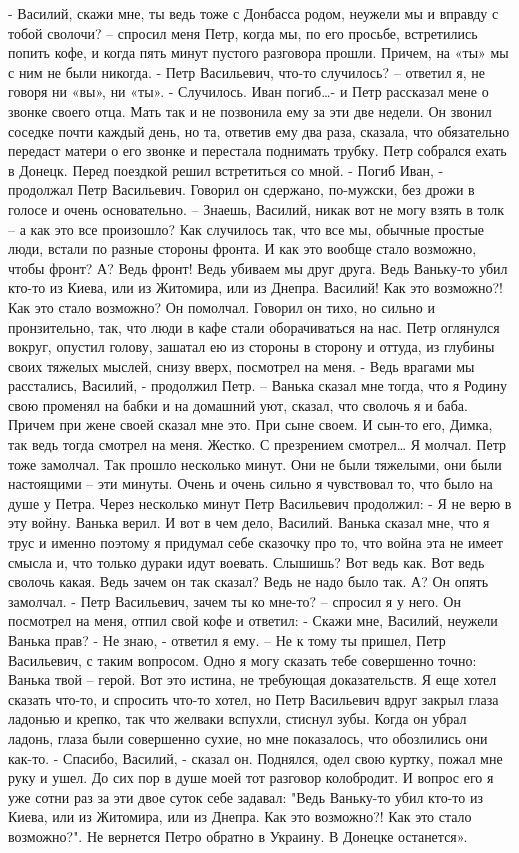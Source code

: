 - Василий, скажи мне, ты ведь тоже с Донбасса родом, неужели мы и вправду с тобой сволочи? – спросил меня Петр, когда мы, по его просьбе, встретились попить кофе, и когда пять минут пустого разговора прошли. 
Причем, на «ты» мы с ним не были никогда.
- Петр Васильевич, что-то случилось? – ответил я, не говоря ни «вы», ни «ты». 
- Случилось. Иван погиб…- и Петр рассказал мене о звонке своего отца. Мать так и не позвонила ему за эти две недели. Он звонил соседке почти каждый день, но та, ответив ему два раза, сказала, что обязательно передаст матери о его звонке и перестала поднимать трубку. Петр собрался ехать в Донецк. Перед поездкой решил встретиться со мной. 
- Погиб Иван, - продолжал Петр Васильевич. Говорил он сдержано, по-мужски, без дрожи в голосе и очень основательно. – Знаешь, Василий, никак вот не могу взять в толк – а как это все произошло? Как случилось так, что все мы, обычные простые люди, встали по разные стороны фронта. И как это вообще стало возможно, чтобы фронт? А? Ведь фронт! Ведь убиваем мы друг друга. Ведь Ваньку-то убил кто-то из Киева, или из Житомира, или из Днепра. Василий! Как это возможно?! Как это стало возможно?
Он помолчал. Говорил он тихо, но сильно и пронзительно, так, что люди в кафе стали оборачиваться на нас. Петр оглянулся вокруг, опустил голову, зашатал ею из стороны в сторону и оттуда, из глубины своих тяжелых мыслей, снизу вверх, посмотрел на меня.
- Ведь врагами мы расстались, Василий, - продолжил Петр. – Ванька сказал мне тогда, что я Родину свою променял на бабки и на домашний уют, сказал, что сволочь я и баба. Причем при жене своей сказал мне это. При сыне своем. И сын-то его, Димка, так ведь тогда смотрел на меня. Жестко. С презрением смотрел…
Я молчал. Петр тоже замолчал. Так прошло несколько минут. Они не были тяжелыми, они были настоящими – эти минуты. Очень и очень сильно я чувствовал то, что было на душе у Петра. 
Через несколько минут Петр Васильевич продолжил:
- Я не верю в эту войну. Ванька верил. И вот в чем дело, Василий. Ванька сказал мне, что я трус и именно поэтому я придумал себе сказочку про то, что война эта не имеет смысла и, что только дураки идут воевать. Слышишь? Вот ведь как. Вот ведь сволочь какая. Ведь зачем он так сказал? Ведь не надо было так. А?
Он опять замолчал. 
- Петр Васильевич, зачем ты ко мне-то? – спросил я у него.
Он посмотрел на меня, отпил свой кофе и ответил:
- Скажи мне, Василий, неужели Ванька прав?
- Не знаю, - ответил я ему. – Не к тому ты пришел, Петр Васильевич, с таким вопросом. Одно я могу сказать тебе совершенно точно: Ванька твой – герой. Вот это истина, не требующая доказательств. 
Я еще хотел сказать что-то, и спросить что-то хотел, но Петр Васильевич вдруг закрыл глаза ладонью и крепко, так что желваки вспухли, стиснул зубы. 
Когда он убрал ладонь, глаза были совершенно сухие, но мне показалось, что обозлились они как-то. 
- Спасибо, Василий, - сказал он. Поднялся, одел свою куртку, пожал мне руку и ушел. 
До сих пор в душе моей тот разговор колобродит. И вопрос его я уже сотни раз за эти двое суток себе задавал: "Ведь Ваньку-то убил кто-то из Киева, или из Житомира, или из Днепра. Как это возможно?! Как это стало возможно?".
Не вернется Петро обратно в Украину. В Донецке останется».

